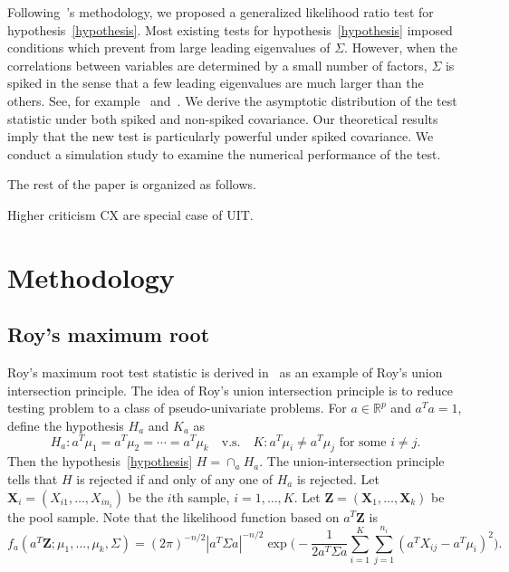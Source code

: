 \documentclass[review]{elsarticle}
\newcommand{\bZ}{\mathbf{Z}}
\newcommand{\bX}{\mathbf{X}}
\theoremstyle{plain}
\theoremstyle{definition}
\theoremstyle{remark}
\begin{document}
    Following~\cite{Zhao2016A}'s methodology, we proposed a generalized likelihood ratio test for hypothesis~\eqref{hypothesis}.
    Most existing tests for hypothesis~\eqref{hypothesis} imposed conditions which prevent from large leading eigenvalues of $\Sigma$.
    However, when the correlations between variables are determined by a small number of factors, $\Sigma$ is spiked in the sense that a few leading eigenvalues are much larger than the others. See, for example~\cite{Cai2012Sparse} and~\cite{Shen2013Consistency}.
    We derive the asymptotic distribution of the test statistic under both spiked and non-spiked covariance.
    Our theoretical results imply that the new test is particularly powerful under spiked covariance.
    We conduct a simulation study to examine the numerical performance of the test.

    The rest of the paper is organized  as follows.

    Higher criticism CX are special case of UIT.
    
\section{Methodology}
\subsection{Roy's maximum root}
Roy's maximum root test statistic is derived in~\cite{Roy1953} as an example of Roy's union intersection principle.
The idea of Roy's union intersection principle is to reduce testing problem to a class of pseudo-univariate problems.
For $a\in \mathbb{R}^p$ and $a^T a=1$, define the hypothesis $H_a$ and $K_a$ as
$$
H_a: a^T\mu_1=a^T\mu_2=\cdots=a^T\mu_k\quad \text{v.s.}\quad K: \text{$a^T\mu_i\neq a^T\mu_j$ for some $i\neq j$}.
$$
Then the hypothesis~\eqref{hypothesis} $H=\cap_{a}H_a$.
The union-intersection principle tells that $H$ is rejected if and only of any one of $H_a$ is rejected.
Let $\bX_i=(X_{i1},\ldots,X_{in_i})$ be the $i$th sample, $i=1,\ldots,K$. Let $\bZ=(\bX_1,\ldots,\bX_k)$ be the pool sample.
Note that the likelihood function based on $a^T \bZ$ is 
$$
f_a(a^T \bZ;\mu_1,\ldots,\mu_k,\Sigma)=
    (2\pi)^{-n/2}|a^T \Sigma a|^{-n/2}\exp\Big(-\frac{1}{2 a^T \Sigma a}\sum_{i=1}^K\sum_{j=1}^{n_i}(a^T X_{ij}-a^T\mu_i)^2\Big).
$$
\end{document}
